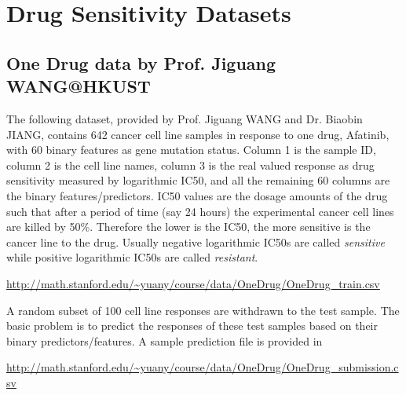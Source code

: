 \documentclass[11pt]{article}
\begin{document}
\section{Drug Sensitivity Datasets}

\subsection{One Drug data by Prof. Jiguang WANG@HKUST}
The following dataset, provided by Prof. Jiguang WANG and Dr. Biaobin JIANG, contains 642 cancer cell line samples in response to one drug, Afatinib, with 60 binary features as gene mutation status. Column 1 is the sample ID, column 2 is the cell line names, column 3 is the real valued response as drug sensitivity measured by logarithmic IC50, and all the remaining 60 columns are the binary features/predictors. IC50 values are the dosage amounts of the drug such that after a period of time (say 24 hours) the experimental cancer cell lines are killed by 50\%. Therefore the lower is the IC50, the more sensitive is the cancer line to the drug. Usually negative logarithmic IC50s are called \emph{sensitive} while positive logarithmic IC50s are called \emph{resistant}.
\begin{center}
\url{http://math.stanford.edu/~yuany/course/data/OneDrug/OneDrug_train.csv}
\end{center}

A random subset of 100 cell line responses are withdrawn to the test sample. The basic problem is to predict the responses of these test samples based on their binary predictors/features. A sample prediction file is provided in 
\begin{center}
\url{http://math.stanford.edu/~yuany/course/data/OneDrug/OneDrug_submission.csv}
\end{center}
\end{document}
